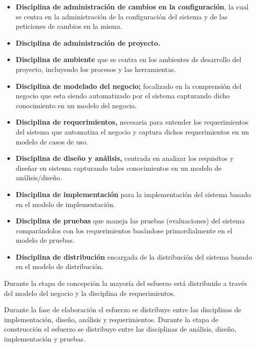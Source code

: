 \begin{itemize}
\item \textbf{Disciplina de administración de cambios en la configuración}, la cual se centra en la administración de la configuración del sistema y de las peticiones de cambios en la misma.

\item \textbf{Disciplina de administración de proyecto.}

\item \textbf{Disciplina de ambiente} que se centra en los ambientes de desarrollo del proyecto, incluyendo los procesos y las herramientas.

\item \textbf{Disciplina de modelado del negocio;} focalizado en la comprensión del negocio que esta siendo automatizado por el sistema capturando dicho conocimiento en un modelo del negocio.

\item \textbf{Disciplina de requerimientos,} necesaria para entender los requerimientos del sistema que automatiza el negocio y captura dichos requerimientos en un modelo de casos de uso.

\item \textbf{Disciplina de diseño y análisis,} centrada en analizar los requisitos y diseñar en sistema capturando tales  conocimientos en un modelo de análisis/diseño.

\item \textbf{Disciplina de implementación} para la implementación del sistema basado en el modelo de implementación.

\item \textbf{Disciplina de pruebas} que maneja las pruebas (evaluaciones) del sistema comparándolos con los requerimientos basándose primordialmente en el modelo de pruebas.

\item \textbf{Disciplina de distribución} encargada de la distribución del sistema basado en el modelo de distribución.
\end{itemize}

Durante la etapa de concepción la mayoría del esfuerzo está distribuido a través del modelo del negocio y la disciplina de requerimientos. 

Durante la fase de elaboración el esfuerzo se distribuye entre las disciplinas de implementación, diseño, análisis y requerimientos. Durante la etapa de construcción el esfuerzo se distribuye entre las disciplinas de análisis, diseño, implementación y pruebas. 

